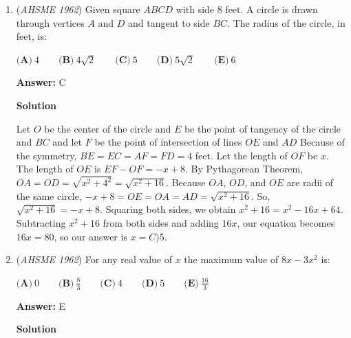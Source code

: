 \begin{enumerate}
\textbf{Solution}

Machine P takes $x+6$ hours, machine Q takes $x+1$ hours, and machine R takes $2x$ hours.We also know that all three working together take $x$ hours. Now the time it takes for all three machines to complete the job is the harmonic mean of the times the three machines take individually; that is,
 \[x=\frac1{\frac1{x+6}+\frac1{x+1}+\frac1{2x}}\]
 \[\frac{x}{x+6}+\frac{x}{x+1}+\frac{x}{2x}=1\]
 \[\frac{x}{x+6}+\frac{x}{x+1}=\frac12\]
 \[2x(x+1)+2x(x+6)=(x+1)(x+6)\]
 \[2x^2+2x+2x^2+12x=x^2+7x+6\]
 \[3x^2+7x-6=0\]
 \[(3x-2)(x+3)=0\]
 \[x\in\{\frac23, -3\}\]Obviously, the number of hours is positive, so the answer is$\boxed{\frac23 \textbf{ (A)}}$.

 


	\item (\textit{AHSME 1962}) Given square $ABCD$ with side $8$ feet. A circle is drawn through vertices $A$ and $D$ and tangent to side $BC$. The radius of the circle, in feet, is:


 $\textbf{(A)}\ 4 \qquad  \textbf{(B)}\ 4\sqrt{2} \qquad  \textbf{(C)}\ 5 \qquad  \textbf{(D)}\ 5\sqrt{2} \qquad  \textbf{(E)}\ 6$

 \textbf{Answer: }C



\textbf{Solution}

Let $O$ be the center of the circle and $E$ be the point of tangency of the circle and $BC$ and let $F$ be the point of intersection of lines $OE$ and $AD$ Because of the symmetry, $BE=EC=AF=FD=4$ feet. Let the length of $OF$ be $x$. The length of $OE$ is $EF-OF=-x+8$. By Pythagorean Theorem, $OA=OD=\sqrt{x^2+4^2}=\sqrt{x^2+16}$. Because $OA$, $OD$, and $OE$ are radii of the same circle, $-x+8=OE=OA=AD=\sqrt{x^2+16}$. So, $\sqrt{x^2+16}=-x+8$. Squaring both sides, we obtain $x^2+16=x^2-16x+64$. Subtracting $x^2+16$ from both sides and adding $16x$, our equation becomes $16x=80$, so our answer is $x=\boxed{C)5}$.

 


	\item (\textit{AHSME 1962}) For any real value of $x$ the maximum value of $8x - 3x^2$ is:


 $\textbf{(A)}\ 0 \qquad  \textbf{(B)}\ \frac{8}{3} \qquad  \textbf{(C)}\ 4 \qquad  \textbf{(D)}\ 5 \qquad  \textbf{(E)}\ \frac{16}{3}$

 \textbf{Answer: }E



\textbf{Solution}


\end{enumerate}

